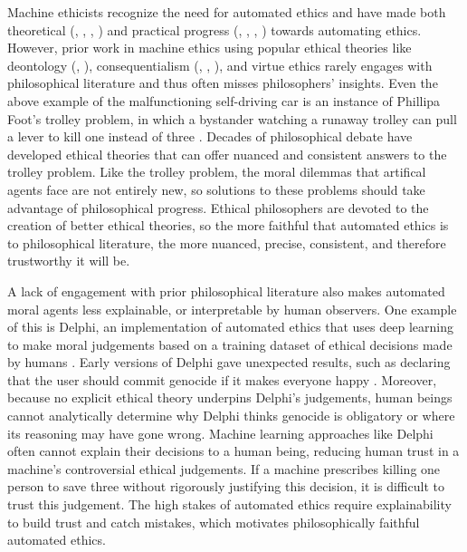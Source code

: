 \begin{isabellebody}
\begin{isamarkuptext}
Machine ethicists recognize the need for automated ethics and have made both theoretical 
(\citep{moralmachine}, \citep{davenport}, \citep{moralmachineonline}, \citep{gabriel}) and practical progress 
(\citep{logicprogramming}, \citep{biology}, \citep{winfield}, \citep{delphi}) towards automating ethics. 
However, prior work in machine ethics using popular ethical theories like deontology (\citep{deon1}, \citep{deon2}), 
consequentialism (\citep{util2}, \citep{util1}, \citep{cloos}), and virtue ethics \citep{virtue2} rarely 
engages with philosophical literature and thus often misses philosophers' insights. Even the above example of 
the malfunctioning self-driving car is an instance of Phillipa Foot's trolley problem, 
in which a bystander watching a runaway trolley can pull a lever to kill one instead of three \citep{foot}. 
Decades of philosophical debate have developed ethical theories that can offer nuanced and 
consistent answers to the trolley problem. Like the trolley problem, the moral dilemmas 
that artifical agents face are not entirely new, so solutions to these problems should take advantage of philosophical 
progress. Ethical philosophers are devoted to the creation of better ethical theories, so the 
more faithful that automated ethics is to philosophical literature, the more nuanced, precise, consistent, and
therefore trustworthy it will be.

A lack of engagement with prior philosophical literature also makes automated moral agents less 
explainable, or interpretable by human observers. One example of this is Delphi, an implementation of automated ethics that uses deep 
learning to make moral judgements based on a training dataset of ethical decisions made by humans \citep{delphi}. 
Early versions of Delphi gave unexpected results, such as declaring that the user should commit 
genocide if it makes everyone happy \citep{verge}. Moreover, because no explicit ethical theory underpins 
Delphi's judgements, human beings cannot analytically determine why Delphi thinks genocide is obligatory
or where its reasoning may have gone wrong. 
Machine learning approaches like Delphi often cannot explain their decisions to a human being, reducing
human trust in a machine's controversial ethical judgements. If a machine prescribes killing one person 
to save three without rigorously justifying this decision, it is difficult to trust this judgement. 
The high stakes of automated ethics require explainability to build trust and catch mistakes, which
motivates philosophically faithful automated ethics.


\end{isamarkuptext}
\end{isabellebody}
